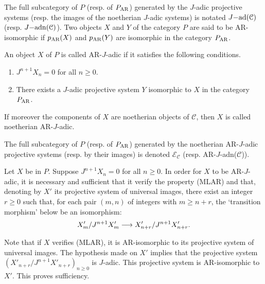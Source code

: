 \documentclass[deligne.tex]{subfiles}
\begin{document}
The full subcategory of $P$ (resp. of $P_{\mathrm{AR}}$) generated by
the $J$-adic projective systems (resp. the images of the noetherian
$J$-adic systems) is notated $J\mathrm{-ad}(\mathcal C)$ (resp. $J\mathrm{-adn}(\mathcal C)$).
Two objects $X$ and $Y$ of the category $P$ are said to be AR-isomorphic
if $p_{\mathrm{AR}}(X)$ and $p_{\mathrm{AR}}(Y)$ are isomorphic in the category $P_{\mathrm{AR}}$.
\begin{definition*}[3.2.1-3.2.2]
	An object $X$ of $P$ is called AR-$J$-adic if it satisfies the
	following conditions.
	\begin{enumerate}[label=(\roman*)]
		\item $J^{n+1}X_n=0$ for all $n\geq0$.
		\item There exists a $J$-adic projective system $Y$ isomorphic
		to $X$ in the category $P_{\mathrm{AR}}$.
	\end{enumerate}
	If moreover the components of $X$ are noetherian objects of
	$\mathcal C$, then $X$ is called noetherian AR-$J$-adic.
\end{definition*}
The full subcategory of $P$ (resp. of $P_{\mathrm{AR}}$) generated by
the noetherian AR-$J$-adic projective systems (resp. by their images) is 
denoted $\mathcal E_{\mathcal C}$ (resp. AR-$J$-adn($\mathcal C$)).
\begin{proposition*}[3.2.3]
	Let $X$ be in $P$. Suppose $J^{n+1}X_n=0$ for all $n\geq0$. In order for
	$X$ to be AR-$J$-adic, it is necessary and sufficient that it verify the
	property (MLAR) and that, denoting by $X'$ its projective system of
	universal images, there exist an integer $r\geq0$ such that, for each
	pair $(m,n)$ of integers with $m\geq n+r$, the `transition morphism'
	below be an isomorphism:
	\begin{equation*}
		X'_m/J^{n+1}X'_m\longrightarrow X'_{n+r}/J^{n+1}X'_{n+r}.
	\end{equation*}
\end{proposition*}
Note that if $X$ verifies (MLAR), it is AR-isomorphic to its projective
system of universal images. The hypothesis made on $X'$ implies that the
projective system $(X'_{n+r}/J^{n+1}X'_{n+r})_{n\geq0}$ is $J$-adic.
This projective system is AR-isomorphic to $X'$. This proves sufficiency.
\end{document}
